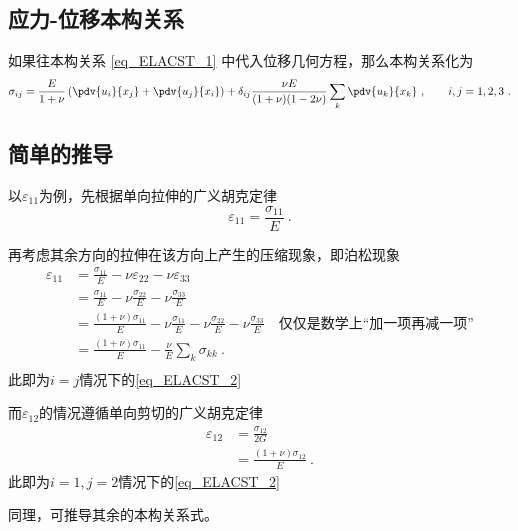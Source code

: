 \subsection{应力-位移本构关系}
如果往本构关系 \autoref{eq_ELACST_1} 中代入位移几何方程，那么本构关系化为
\begin{equation}
\sigma_{ij}=\frac{E}{1+\nu}\left(\pdv{u_i}{x_j}+\pdv{u_j}{x_i}\right)
+\delta_{ij}\frac{\nu E}{(1+\nu)(1-2\nu)}\sum_k\pdv{u_k}{x_k}~,\qquad i,j=1,2,3~.
\end{equation}

\subsection{简单的推导}
以$\varepsilon_{11}$为例，先根据单向拉伸的广义胡克定律
$$\varepsilon_{11} = \frac{\sigma_{11}}{E}~.$$

再考虑其余方向的拉伸在该方向上产生的压缩现象，即泊松现象
$$
\begin{aligned}
\varepsilon_{11} &= \frac{\sigma_{11}}{E} - \nu \varepsilon_{22}  - \nu \varepsilon_{33}\\
&=\frac{\sigma_{11}}{E} - \nu\frac{\sigma_{22}}{E} - \nu\frac{\sigma_{33}}{E}\\
&=\frac{(1+\nu)\sigma_{11}}{E} - \nu\frac{\sigma_{11}}{E}  - \nu\frac{\sigma_{22}}{E} - \nu\frac{\sigma_{33}}{E} \quad \text{仅仅是数学上“加一项再减一项”}\\
&=\frac{(1+\nu)\sigma_{11}}{E} - \frac{\nu}{E}\sum_k \sigma_{kk} ~.\\
\end{aligned}
$$
此即为$i=j$情况下的\autoref{eq_ELACST_2} 

而$\varepsilon_{12}$的情况遵循单向剪切的广义胡克定律
$$
\begin{aligned}
\varepsilon_{12} &= \frac{\sigma_{12}}{2G}\\
&=\frac{(1+\nu)\sigma_{12}}{E}~.
\end{aligned}
$$
此即为$i=1, j=2$情况下的\autoref{eq_ELACST_2} 

同理，可推导其余的本构关系式。
